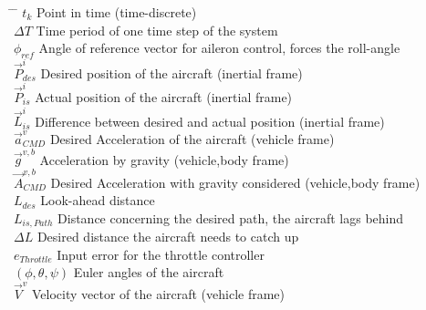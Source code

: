 \documentclass[11pt,a4paper]{scrartcl}		%
\begin{document}
\begin{appendix}
\begin{tabbing}
	 \hspace{2cm} \= \hspace{2cm} \= \hspace{3cm} \kill
	\> $t_k$ \> Point in time (time-discrete)\\	
	\> $\Delta T$ \> Time period of one time step of the system\\
	\> $\phi_{ref}$ \> Angle of reference vector for aileron control, forces the roll-angle\\
	\> $\vec{P}_{des}^i$ \> Desired position of the aircraft (inertial frame)\\
	\> $\vec{P}_{is}^i$ \> Actual position of the aircraft (inertial frame)\\
	\> $\vec{L}_{is}^i$ \> Difference between desired and actual position (inertial frame)\\
	\> $\vec{a}_{CMD}^v$ \> Desired Acceleration of the aircraft (vehicle frame)\\
	\> $\vec{g}^{v,b}$ \> Acceleration by gravity (vehicle,body frame)\\
	\> $\vec{A}_{CMD}^{v,b}$ \> Desired Acceleration with gravity considered (vehicle,body frame)\\
	\> $L_{des}$ \> Look-ahead distance \\
	\> $L_{is,Path}$ \> Distance concerning the desired path, the aircraft lags behind \\
	\> $\Delta L$ \> Desired distance the aircraft needs to catch up \\
	\> $e_{Throttle}$ \> Input error for the throttle controller \\
	\> $(\phi,\theta,\psi)$ \> Euler angles of the aircraft \\
	\> $\vec{V}^v$ \> Velocity vector of the aircraft (vehicle frame)\\	
	
\end{tabbing}


\end{appendix}
\end{document}
